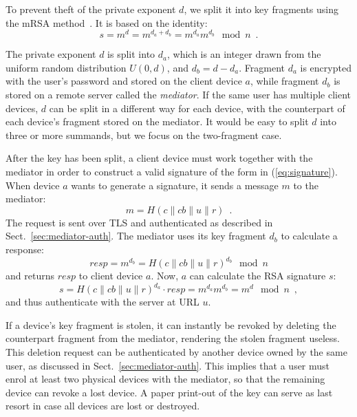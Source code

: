 \documentclass{llncs}
\newcommand*{\concat}{\mathbin{\|}}
\begin{document}
To prevent theft of the private exponent $d$, we split it into key fragments using the mRSA
method~\cite{Boneh01,Kutyiowski12}. It is based on the identity:
\begin{equation}
s = m^d = m^{d_a + d_b} = m^{d_a} m^{d_b} \mod n \enspace.
\end{equation}

The private exponent $d$ is split into $d_a$, which is an integer drawn from the uniform random
distribution $U(0, d)$, and $d_b = d - d_a$. Fragment $d_a$ is encrypted with the user's password
and stored on the client device $a$, while fragment $d_b$ is stored on a remote server called the
\emph{mediator}. If the same user has multiple client devices, $d$ can be split in a different way
for each device, with the counterpart of each device's fragment stored on the mediator. It would be
easy to split $d$ into three or more summands, but we focus on the two-fragment case.

After the key has been split, a client device must work together with the mediator in order to
construct a valid signature of the form in (\ref{eq:signature}). When device $a$ wants to generate a
signature, it sends a message $m$ to the mediator:
\begin{equation}\label{eq:mediator-req}
m = H(c \concat \mathit{cb} \concat u \concat r) \enspace.
\end{equation}
The request is sent over TLS and authenticated as described in Sect.~\ref{sec:mediator-auth}. The
mediator uses its key fragment $d_b$ to calculate a response:
\begin{equation}\label{eq:mediator-resp}
\mathit{resp} = m^{d_b} = H(c \concat \mathit{cb} \concat u \concat r)^{d_b} \mod n
\end{equation}
and returns $\mathit{resp}$ to client device $a$. Now, $a$ can calculate the RSA signature $s$:
\begin{equation}\label{eq:assemble-sig}
s = H(c \concat \mathit{cb} \concat u \concat r)^{d_a} \cdot \mathit{resp} = m^{d_a} m^{d_b}
  = m^d \mod n \enspace,
\end{equation}
and thus authenticate with the server at URL $u$.

If a device's key fragment is stolen, it can instantly be revoked by deleting the counterpart
fragment from the mediator, rendering the stolen fragment useless. This deletion request can be
authenticated by another device owned by the same user, as discussed in
Sect.~\ref{sec:mediator-auth}. This implies that a user must enrol at least two physical devices
with the mediator, so that the remaining device can revoke a lost device. A paper print-out of the
key can serve as last resort in case all devices are lost or destroyed.
\end{document}
